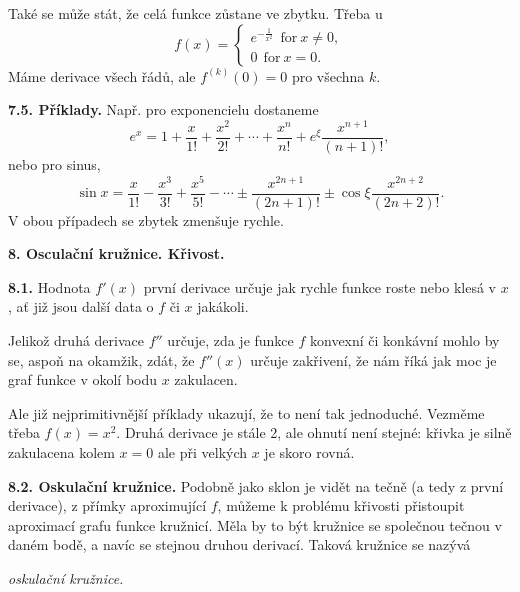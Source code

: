 \documentclass[12pt]{article}
\begin{document}
{Také se může stát,  že celá funkce zůstane ve zbytku. Třeba u  
$$
f(x)=\begin{cases} e^{-\frac{1}{x^2}}\ \ \text{for}\ x\neq 0,\\
                       0\ \ \text{for}\ x=0.\end{cases}
$$                       
Máme derivace všech řádů, ale $f^{(k)}(0)=0$ pro všechna $k$.
 
 \bigskip
 
  
 {\bf 7.5. Příklady.} Např. pro exponencielu dostaneme
 $$
 e^x=1+\frac{x}{1!}+\frac{x^2}{2!}+ \cdots +\frac{x^n}{n!}+
 e^\xi\frac{x^{n+1}}{(n+1)!},
 $$
 nebo pro sinus,
 $$
 \sin x= \frac{x}{1!}-\frac{x^3}{3!}+\frac{x^5}{5!}-\cdots\pm\frac{x^{2n+1}}{(2n+1)!}
 \pm\cos\xi\frac{x^{2n+2}}{(2n+2)!}.
 $$
 V obou případech se zbytek zmenšuje rychle.


\vskip10mm
 
 {\large\bf 8. Osculační kružnice. Křivost.}
 
 \bigskip
 
 {\bf 8.1.} Hodnota $f'(x)$ první derivace určuje jak rychle funkce
 roste nebo klesá v $x$, ať již jsou další data o
  $f$ či $x$ jakákoli.
 
Jelikož druhá derivace $f''$ určuje, zda je funkce $f$ konvexní či konkávní mohlo by se, aspoň na okamžik, zdát, že $f''(x)$ určuje zakřivení, že nám říká jak moc je graf funkce v okolí bodu $x$ zakulacen.
 
 Ale již nejprimitivnější příklady ukazují, že to není tak jednoduché. Vezměme třeba $f(x)=x^2$. Druhá derivace je stále 2, ale ohnutí není stejné: křivka je silně zakulacena  kolem $x=0$ ale při velkých $x$ je skoro rovná.
 
  \bigskip
 
 {\bf 8.2. Oskulační kružnice.} Podobně jako sklon je vidět na tečně (a tedy z první derivace),  z přímky aproximující $f$, můžeme k problému křivosti přistoupit aproximací grafu funkce kružnicí. Měla by to být kružnice
se společnou tečnou v daném bodě, a navíc se stejnou druhou derivací. Taková kružnice se nazývá

 \smallskip
 
 \centerline{\em oskulační kružnice.}
 
 \smallskip
 
}
\end{document}
